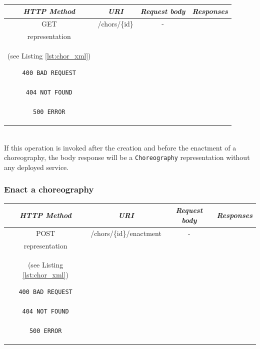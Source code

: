 \begin{tabular}{|c|c|c|c|}
\hline 
\itshape{HTTP Method} & \itshape{URI} & \itshape{Request body} & \itshape{Responses} \\ 
\hline 
GET & /chors/\{id\} & - &
\begin{minipage}{2in}
\begin{verbatim}

200 OK
location = "/chors/{id}"

Body: 
\end{verbatim}
\verb!Choreography! XML \\
representation \\
(see Listing \ref{lst:chor_xml})
\begin{verbatim}
400 BAD REQUEST

404 NOT FOUND

500 ERROR

\end{verbatim}
\end{minipage} 
\\ 
\hline 
\end{tabular} \\

If this operation is invoked after the creation and before the enactment of a choreography, the body response will be a \verb!Choreography! representation without any deployed service.

\subsubsection*{Enact a choreography}

\begin{tabular}{|c|c|c|c|}
\hline 
\itshape{HTTP Method} & \itshape{URI} & \itshape{Request body} & \itshape{Responses} \\ 
\hline 
POST & /chors/\{id\}/enactment & - &
\begin{minipage}{2in}
\begin{verbatim}

200 OK
location = "/chors/{id}"
Body: 
\end{verbatim}
\verb!Choreography! XML \\
representation \\
(see Listing \ref{lst:chor_xml})
\begin{verbatim}
400 BAD REQUEST

404 NOT FOUND

500 ERROR

\end{verbatim}
\end{minipage} 
\\ 
\hline 
\end{tabular} \\

